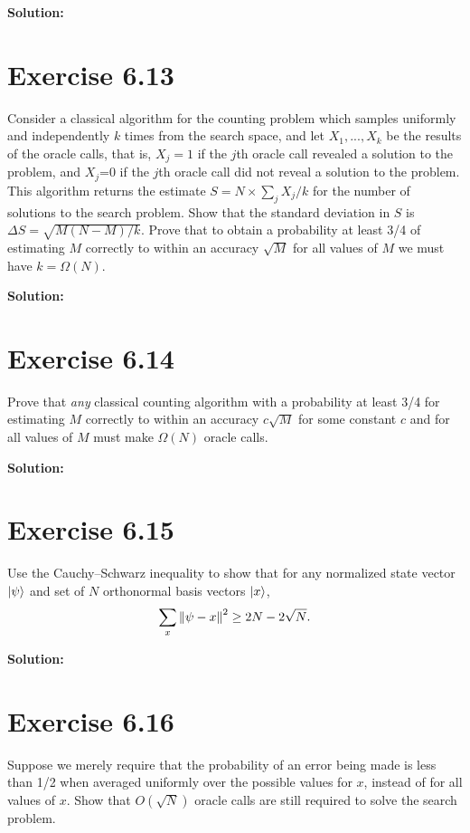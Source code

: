 \documentclass{book}
\begin{document}
        \textbf{Solution:}
    
    \section*{Exercise 6.13}
        Consider a classical algorithm for the counting problem which samples uniformly and independently $k$ times from the search space, and let $X_1, ..., X_k$ be the results of the oracle calls, that is, $X_j = 1$ if the $j$th oracle call revealed a solution to the problem, and $X_j$=0 if the $j$th oracle call did not reveal a solution to the problem. This algorithm returns the estimate $S = N\times \sum_j X_j/k$ for the number of solutions to the search problem. Show that the standard deviation in $S$ is $\Delta S = \sqrt{M(N-M)/k}$. Prove that to obtain a probability at least 3/4 of estimating $M$ correctly to within an accuracy $\sqrt{M}$ for all values of $M$ we must have $k = \Omega(N)$.
        
        \textbf{Solution:}
    
    \section*{Exercise 6.14}
        Prove that \emph{any} classical counting algorithm with a probability at least 3/4 for estimating $M$ correctly to within an accuracy $c\sqrt{M}$ for some constant $c$ and for all values of $M$ must make $\Omega (N)$ oracle calls. 
        
        \textbf{Solution:}
    
    \section*{Exercise 6.15}
        Use the Cauchy–Schwarz inequality to show that for any normalized state vector $\ket{\psi}$ and set of $N$ orthonormal basis vectors $\ket{x}$,
        \begin{align}
            \sum_x \norm{\psi -x}^2 \geq 2N-2\sqrt{N}.
        \end{align}
        
        \textbf{Solution:}
        
    \section*{Exercise 6.16}
        Suppose we merely require that the probability of an error being made is less than 1/2 when averaged uniformly over the possible values for $x$, instead of for all values of $x$. Show that $O(\sqrt{N})$ oracle calls are still required to solve the search problem. 
        
\end{document}
